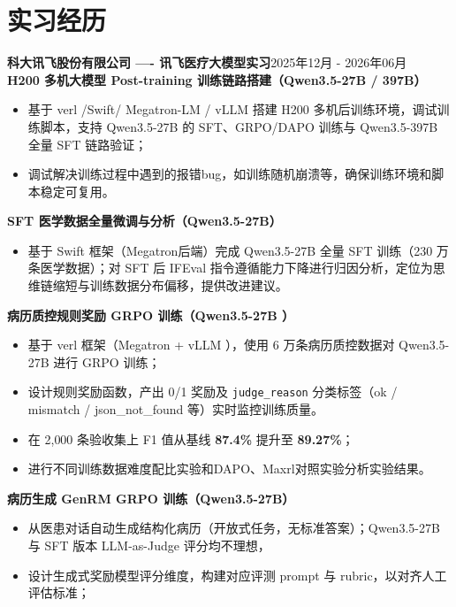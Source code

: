 \documentclass[11pt,a4paper]{article}
\newcommand{\entry}[2]{%
    \noindent\textbf{#1}\hfill{\color{textgray}#2}\\
}
\begin{document}
\section{实习经历}

\entry{科大讯飞股份有限公司 ---- 讯飞医疗大模型实习}{2025年12月 - 2026年06月}

\textbf{H200 多机大模型 Post-training 训练链路搭建（Qwen3.5-27B / 397B）}
\begin{itemize}
    \item 基于 verl /Swift/ Megatron-LM / vLLM  搭建 H200 多机后训练环境，调试训练脚本，支持 Qwen3.5-27B 的 SFT、GRPO/DAPO 训练与 Qwen3.5-397B 全量 SFT 链路验证；
    \item 调试解决训练过程中遇到的报错bug，如训练随机崩溃等，确保训练环境和脚本稳定可复用。
\end{itemize}

\textbf{{SFT 医学数据全量微调与分析（Qwen3.5-27B）}}
\begin{itemize}
    \item 基于 Swift 框架（Megatron后端）完成 Qwen3.5-27B 全量 SFT 训练（230 万条医学数据）；对 SFT 后 IFEval 指令遵循能力下降进行归因分析，定位为思维链缩短与训练数据分布偏移，提供改进建议。
\end{itemize}

\textbf{病历质控规则奖励 GRPO 训练（Qwen3.5-27B ）}
\begin{itemize}
    \item 基于 verl 框架（Megatron + vLLM ），使用 6 万条病历质控数据对 Qwen3.5-27B 进行 GRPO 训练；
    \item 设计规则奖励函数，产出 0/1 奖励及 \texttt{judge\_reason} 分类标签（ok / mismatch / json\_not\_found 等）实时监控训练质量。
    \item 在 2{,}000 条验收集上 F1 值从基线 \textbf{87.4\%} 提升至 \textbf{89.27\%}；
    \item 进行不同训练数据难度配比实验和DAPO、Maxrl对照实验分析实验结果。
\end{itemize}

\textbf{病历生成 GenRM GRPO 训练（Qwen3.5-27B）}
\begin{itemize}
    \item 从医患对话自动生成结构化病历（开放式任务，无标准答案）；Qwen3.5-27B 与 SFT 版本 LLM-as-Judge 评分均不理想，
    \item 设计生成式奖励模型评分维度，构建对应评测 prompt 与 rubric，以对齐人工评估标准；
\end{itemize}
\end{document}
